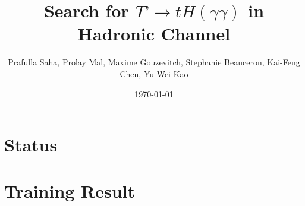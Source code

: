 \documentclass{beamer}
\title{Search for $T’ \to tH(\gamma\gamma)$ in Hadronic Channel}
\author{Prafulla Saha, Prolay Mal, Maxime Gouzevitch, Stephanie Beauceron, Kai-Feng Chen, Yu-Wei Kao}
\institute{National Taiwan University}
\date{\today}
\begin{document}
\frame{\titlepage}

\section{Status}


\section{Training Result}




















\end{document}
